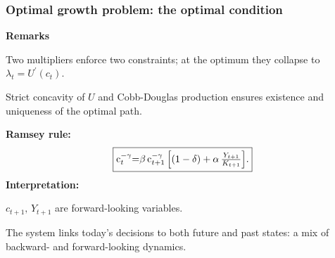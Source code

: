 \documentclass[xcolor=x11names,compress,aspectratio=169]{beamer}%
\makeatletter
\renewenvironment{itemize}{\begin{compactitemize}[<+-| alert@+>]}{\end{compactitemize}}
\makeatother
\begin{document}
\begin{frame}%
%

\frametitle{Optimal growth problem: the optimal condition}%


\textbf{Remarks}

\begin{itemize}
\item Two multipliers enforce two constraints; at the optimum they collapse to
$\lambda_{t}=U^{\prime}(c_{t}).$

\item Strict concavity of $U$ and Cobb-Douglas production ensures existence
and uniqueness of the optimal path.
\end{itemize}

\textbf{Ramsey rule:}
\[
\fbox{c$_{t}^{-\gamma}$=$\beta$\thinspace c$_{t+1}^{-\gamma}\left[
(1-\delta)+\alpha\,\frac{Y_{t+1}}{K_{t+1}}\right]  $.}%
\]
\textbf{Interpretation:}

\begin{itemize}
\item $c_{t+1},\,Y_{t+1}$ are forward-looking variables.

\item The system links today's decisions to both future and past states: a mix
of backward- and forward-looking dynamics.
\end{itemize}

%

\transboxout
\end{frame}%
%
\end{document}
